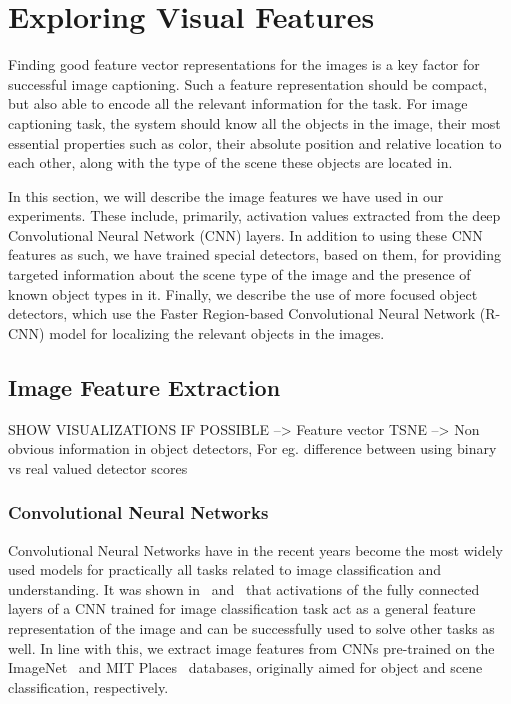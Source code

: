 \chapter{Exploring Visual Features}
\label{chapter:VisFeatChapter}

Finding good feature vector representations for the images is
a key factor for successful image captioning.
Such a feature representation should be compact, but also able to
encode all the relevant information for the task. 
For image captioning task, the system should know all the
objects in the image, their most essential properties such as color,
their absolute position and relative location to each other, along
with the type of the scene these objects are located in.

In this section, we will describe the image features we have used in
our experiments.
These include, primarily, activation values extracted from
the deep Convolutional Neural Network (CNN) layers.
In addition to using these CNN features as such, we have trained
special detectors, based on them, for providing targeted
information about the scene type of the image and the presence of
known object types in it.
Finally, we describe the use of more focused object detectors, which
use the Faster Region-based Convolutional Neural Network (R-CNN) model for
localizing the relevant objects in the images.

\section{Image Feature Extraction}
\label{sec:ImageFeat}

SHOW VISUALIZATIONS IF POSSIBLE
    --> Feature vector TSNE
    --> Non obvious information in object detectors, For eg. difference between
    using binary vs real valued detector scores
\subsection{Convolutional Neural Networks}
Convolutional Neural Networks have in the recent years become the most
widely used models for practically all tasks related to image
classification and understanding.
It was shown in~\cite{Donahue2014} and~\cite{Razavian2014CVPR} that
activations of the fully connected layers of a CNN trained for image
classification task act as a general feature representation of the
image and can be successfully used to solve other tasks as well.
In line with this, we extract image features from CNNs pre-trained on
the ImageNet~\cite{ImagenetOrig} and MIT Places~\cite{Zhou2014NIPS}
databases, originally aimed for object and scene classification,
respectively.

